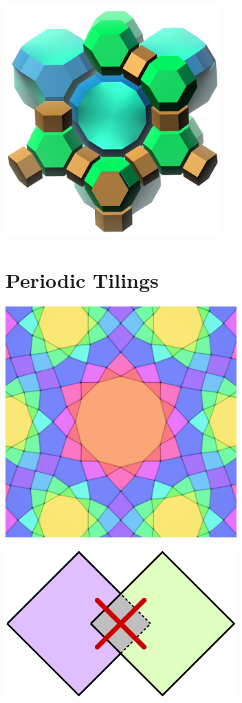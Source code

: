 \documentclass{beamer}
\begin{document}
\begin{frame}
  \begin{center}
    \includegraphics[height=3.5in]{fau-tiling}
  \end{center}
\end{frame}


\section{Periodic Tilings}

\begin{frame}
  \begin{center}
    \includegraphics[height=3.5in]{alhambra}
  \end{center}
\end{frame}

\begin{frame}
  \begin{center}
    \includegraphics[width=3.5in]{overlaps}
  \end{center}
\end{frame}
\end{document}
